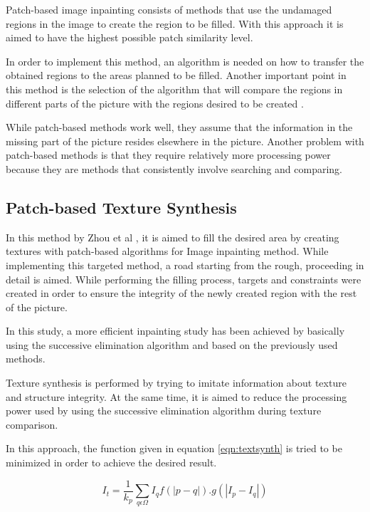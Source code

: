 Patch-based image inpainting consists of methods that use the undamaged regions in the image to create the region to be filled. With this approach it is aimed to have the highest possible patch similarity level.

In order to implement this method, an algorithm is needed on how to transfer the obtained regions to the areas planned to be filled. Another important point in this method is the selection of the algorithm that will compare the regions in different parts of the picture with the regions desired to be created \cite{patchmatch}.

While patch-based methods work well, they assume that the information in the missing part of the picture resides elsewhere in the picture. Another problem with patch-based methods is that they require relatively more processing power because they are methods that consistently involve searching and comparing.

\subsection{Patch-based Texture Synthesis}

In this method by Zhou et al \cite{patch_based_tex_synthesis}, it is aimed to fill the desired area by creating textures with patch-based algorithms for Image inpainting method. While implementing this targeted method, a road starting from the rough, proceeding in detail is aimed. While performing the filling process, targets and constraints were created in order to ensure the integrity of the newly created region with the rest of the picture.

In this study, a more efficient inpainting study has been achieved by basically using the successive elimination algorithm and based on the previously used methods.

Texture synthesis is performed by trying to imitate information about texture and structure integrity. At the same time, it is aimed to reduce the processing power used by using the successive elimination algorithm during texture comparison.

In this approach, the function given in equation \ref{eqn:textsynth} is tried to be minimized in order to achieve the desired result.

\begin{equation}
    \label{eqn:textsynth}
    I_t = \frac{1}{k_p} \displaystyle\sum\limits_{q\epsilon\Omega} {I_qf(|p-q|).g(|I_p-I_q|)}
\end{equation}

